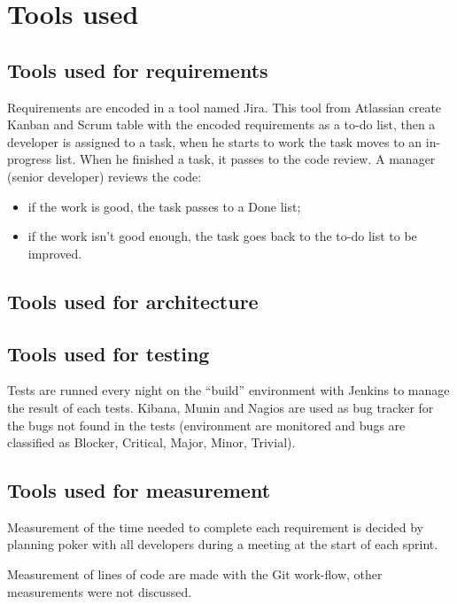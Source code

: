 \documentclass[a4paper, 11pt]{article}
\begin{document}
    \section{Tools used}
    \subsection{Tools used for requirements}

    Requirements are encoded in a tool named Jira. This tool from Atlassian
    create Kanban and Scrum table with the encoded requirements as a to-do list,
    then a developer is assigned to a task, when he starts to work the task moves
    to an in-progress list. When he finished a task, it passes to the code review.
    A manager (senior developer) reviews the code:

    \begin{itemize}
        \item if the work is good, the task passes to a Done list;
        \item if the work isn't good enough, the task goes back to the to-do list
        to be improved.
    \end{itemize}

    \subsection{Tools used for architecture}
    \subsection{Tools used for testing}

    Tests are runned every night on the \enquote{build} environment with Jenkins
    to manage the result of each tests. Kibana, Munin and Nagios are used as bug tracker
    for the bugs not found in the tests (environment are monitored and bugs are
    classified as Blocker, Critical, Major, Minor, Trivial).
    \subsection{Tools used for measurement}

    Measurement of the time needed to complete each requirement is decided by
    planning poker with all developers during a meeting at the start of each
    sprint. \newline

    Measurement of lines of code are made with the Git work-flow, other
    measurements were not discussed.
\end{document}
